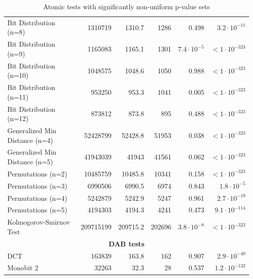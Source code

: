 \documentclass[
	digital,    %
	oneside,    %
	color,
	11pt,
	nocover,
	notable,
	nolof,
	nolot,
]{fithesis3}
\newcommand{\rd}{\cellcolor{red!40}}
\theoremstyle{definition}
\theoremstyle{remark}
\begin{document}
\begin{table}
\begin{nomar}
{\begin{tabular}{@{}lrrrrr@{}}
Bit Distribution (n=8)         & 1310719           & 1310.7        & 1286          & 0.498                  & $3.2 \cdot 10^{-11}$  \rd \\
Bit Distribution (n=9)         & 1165083           & 1165.1        & 1301          & $7.4\cdot 10^{-5}$ \rd & $<1\cdot 10^{-323}$   \rd \\
Bit Distribution (n=10)        & 1048575           & 1048.6        & 1050          & 0.988                  & $<1\cdot 10^{-323}$   \rd \\
Bit Distribution (n=11)        & 953250            & 953.3         & 1041          & 0.005                  & $<1\cdot 10^{-323}$   \rd \\
Bit Distribution (n=12)        & 873812            & 873.8         & 895           & 0.488                  & $<1\cdot 10^{-323}$   \rd \\
Generalized Min Distance (n=4) & 52428799          & 52428.8       & 51953         & 0.038                  & $<1\cdot 10^{-323}$   \rd \\
Generalized Min Distance (n=5) & 41943039          & 41943         & 41561         & 0.062                  & $<1\cdot 10^{-323}$   \rd \\
Permutations (n=2)             & 10485759          & 10485.8       & 10341         & 0.158                  & $<1\cdot 10^{-323}$   \rd \\
Permutations (n=3)             & 6990506           & 6990.5        & 6974          & 0.843                  & $1.8 \cdot 10^{-5}$   \rd \\
Permutations (n=4)             & 5242879           & 5242.9        & 5247          & 0.961                  & $2.7 \cdot 10^{-19}$  \rd \\
Permutations (n=5)             & 4194303           & 4194.3        & 4241          & 0.473                  & $9.1 \cdot 10^{-114}$ \rd \\
Kolmogorov-Smirnov Test        & 209715199         & 209715.2      & 202696        & $3.8\cdot 10^{-8}$ \rd & $<1\cdot 10^{-323}$   \rd \\ \midrule
\multicolumn{6}{c}{\textbf{DAB tests}} \\ \midrule
DCT                            & 163839            & 163.8         & 162           & 0.907                  & $2.9 \cdot 10^{-40}$  \rd \\
Monobit 2                      & 32263             & 32.3          & 28            & 0.537                  & $1.2 \cdot 10^{-132}$ \rd \\ \bottomrule
\end{tabular}
}
\end{nomar}
\caption{Atomic tests with significantly non-uniform p-value sets}
\label{tab:non_uniform_atomic_tests}
\end{table}
\end{document}
